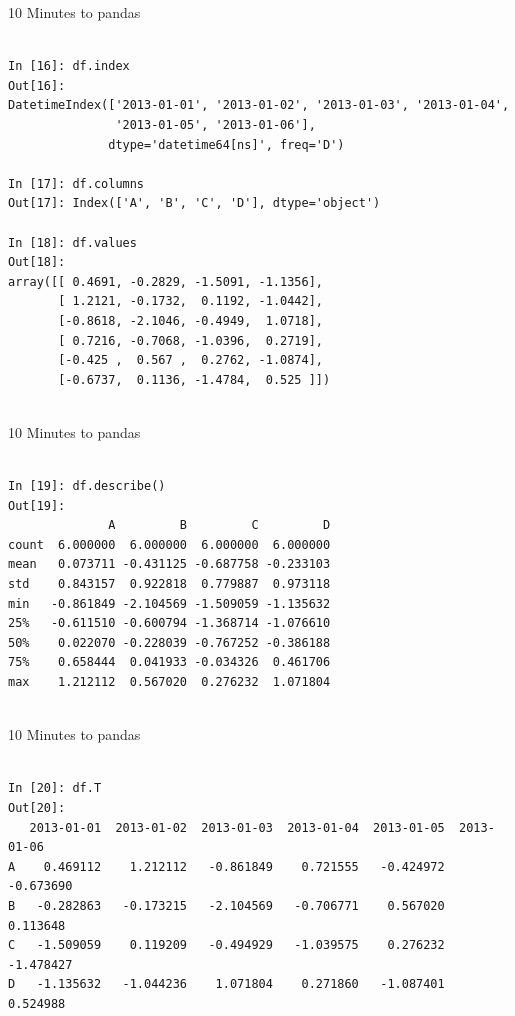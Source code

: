 \documentclass{beamer}
\begin{document}
\begin{frame}[t,fragile]{10 Minutes to pandas}


	\scriptsize
\begin{verbatim}

In [16]: df.index
Out[16]: 
DatetimeIndex(['2013-01-01', '2013-01-02', '2013-01-03', '2013-01-04',
               '2013-01-05', '2013-01-06'],
              dtype='datetime64[ns]', freq='D')

In [17]: df.columns
Out[17]: Index(['A', 'B', 'C', 'D'], dtype='object')

In [18]: df.values
Out[18]: 
array([[ 0.4691, -0.2829, -1.5091, -1.1356],
       [ 1.2121, -0.1732,  0.1192, -1.0442],
       [-0.8618, -2.1046, -0.4949,  1.0718],
       [ 0.7216, -0.7068, -1.0396,  0.2719],
       [-0.425 ,  0.567 ,  0.2762, -1.0874],
       [-0.6737,  0.1136, -1.4784,  0.525 ]])


\end{verbatim}


\end{frame}


\begin{frame}[t,fragile]{10 Minutes to pandas}


	\scriptsize
\begin{verbatim}

In [19]: df.describe()
Out[19]: 
              A         B         C         D
count  6.000000  6.000000  6.000000  6.000000
mean   0.073711 -0.431125 -0.687758 -0.233103
std    0.843157  0.922818  0.779887  0.973118
min   -0.861849 -2.104569 -1.509059 -1.135632
25%   -0.611510 -0.600794 -1.368714 -1.076610
50%    0.022070 -0.228039 -0.767252 -0.386188
75%    0.658444  0.041933 -0.034326  0.461706
max    1.212112  0.567020  0.276232  1.071804


\end{verbatim}


\end{frame}


\begin{frame}[t,fragile]{10 Minutes to pandas}


	\scriptsize
\begin{verbatim}

In [20]: df.T
Out[20]: 
   2013-01-01  2013-01-02  2013-01-03  2013-01-04  2013-01-05  2013-01-06
A    0.469112    1.212112   -0.861849    0.721555   -0.424972   -0.673690
B   -0.282863   -0.173215   -2.104569   -0.706771    0.567020    0.113648
C   -1.509059    0.119209   -0.494929   -1.039575    0.276232   -1.478427
D   -1.135632   -1.044236    1.071804    0.271860   -1.087401    0.524988


\end{verbatim}


\end{frame}
\end{document}

